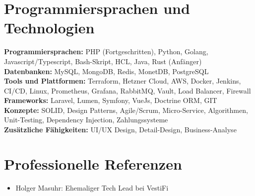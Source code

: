 \documentclass[a4paper,10pt]{article}
\begin{document}
    \section*{Programmiersprachen und Technologien}
    \textbf{Programmiersprachen:} PHP (Fortgeschritten), Python, Golang, Javascript/Typescript, Bash-Skript, HCL, Java, Rust (Anfänger)\\
    \textbf{Datenbanken:} MySQL, MongoDB, Redis, MonetDB, PostgreSQL\\
    \textbf{Tools und Plattformen:} Terraform, Hetzner Cloud, AWS, Docker, Jenkins, CI/CD, Linux, Prometheus, Grafana, RabbitMQ, Vault, Load Balancer, Firewall\\
    \textbf{Frameworks:} Laravel, Lumen, Symfony, VueJs, Doctrine ORM, GIT\\
    \textbf{Konzepte:} SOLID, Design Patterns, Agile/Scrum, Micro-Service, Algorithmen, Unit-Testing, Dependency Injection, Zahlungssysteme\\
    \textbf{Zusätzliche Fähigkeiten:} UI/UX Design, Detail-Design, Business-Analyse

    \section*{Professionelle Referenzen}
    \begin{itemize}
        \item Holger Masuhr: Ehemaliger Tech Lead bei VestiFi
    \end{itemize}
\end{document}
